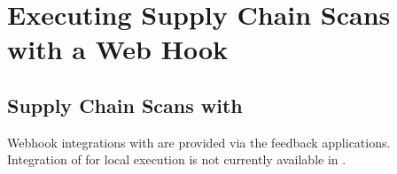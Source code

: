 \chapter{Executing Supply Chain Scans with a Web Hook}\label{chap:build_env_affinity}


\section{Supply Chain Scans with \cxone}

Webhook integrations with \cxone are provided via the feedback applications.
Integration of \scaresolver for local execution is not currently available in
\cxone.
















